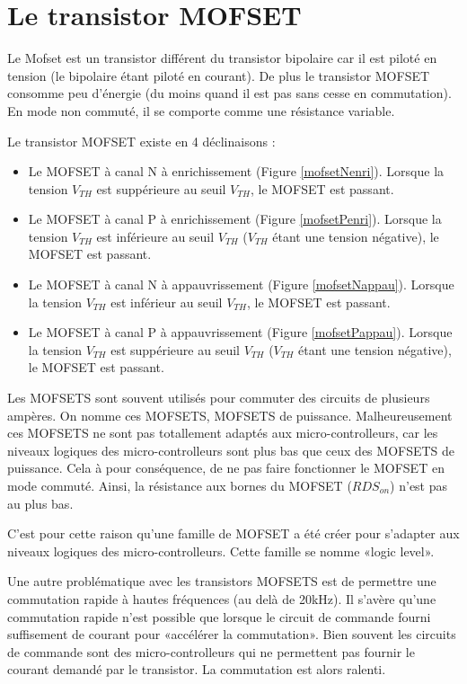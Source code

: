 \documentclass[10pt,a4paper]{article}
\begin{document}
\section{Le transistor MOFSET}

Le Mofset est un transistor différent du transistor bipolaire car il est piloté en tension (le bipolaire étant piloté en courant). De plus le transistor MOFSET
consomme peu d'énergie (du moins quand il est pas sans cesse en commutation).
En mode non commuté, il se comporte comme une résistance variable.

Le transistor MOFSET existe en 4 déclinaisons :
\begin{itemize}
  \item Le MOFSET à canal N à enrichissement (Figure \ref{mofsetNenri}). Lorsque la tension $V_{TH}$ est suppérieure au seuil $V_{TH}$, le MOFSET est passant.
  \item Le MOFSET à canal P à enrichissement (Figure \ref{mofsetPenri}). Lorsque la tension $V_{TH}$ est inférieure au seuil $V_{TH}$ ($V_{TH}$ étant une tension négative), le MOFSET est passant.
  \item Le MOFSET à canal N à appauvrissement (Figure \ref{mofsetNappau}). Lorsque la tension $V_{TH}$ est inférieur au seuil $V_{TH}$, le MOFSET est passant.
  \item Le MOFSET à canal P à appauvrissement (Figure \ref{mofsetPappau}). Lorsque la tension $V_{TH}$ est suppérieure au seuil $V_{TH}$ ($V_{TH}$ étant une tension négative), le MOFSET est passant.
\end{itemize}

Les MOFSETS sont souvent utilisés pour commuter des circuits de plusieurs ampères. On nomme ces MOFSETS, MOFSETS de puissance.
Malheureusement ces MOFSETS ne sont pas totallement adaptés aux micro-controlleurs, car les niveaux logiques des micro-controlleurs sont plus bas que ceux des MOFSETS
de puissance. Cela à pour conséquence, de ne pas faire fonctionner le MOFSET en mode commuté. Ainsi, la résistance aux bornes du MOFSET ($RDS_{on}$) n'est pas au plus bas.

C'est pour cette raison qu'une famille de MOFSET a été créer pour s'adapter aux niveaux logiques des micro-controlleurs. Cette famille se nomme «logic level».

Une autre problématique avec les transistors MOFSETS est de permettre une commutation rapide à hautes fréquences (au delà de 20kHz). Il s'avère qu'une commutation rapide
n'est possible que lorsque le circuit de commande fourni suffisement de courant pour «accélérer la commutation». Bien souvent les circuits de commande sont des
micro-controlleurs qui ne permettent pas fournir le courant demandé par le transistor. La commutation est alors ralenti.
\end{document}
